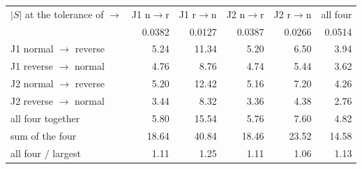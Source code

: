 \begin{tabular}{lrrrrr}
\toprule
$|S|$ at the tolerance of $\to$ & J1 n$\to$r & J1 r$\to$n & J2 n$\to$r & J2 r$\to$n & all four \\
 & 0.0382 & 0.0127 & 0.0387 & 0.0266 & 0.0514 \\
\midrule
J1 normal $\to$ reverse & 5.24 & 11.34 & 5.20 & 6.50 & 3.94 \\
J1 reverse $\to$ normal & 4.76 & 8.76 & 4.74 & 5.44 & 3.62 \\
J2 normal $\to$ reverse & 5.20 & 12.42 & 5.16 & 7.20 & 4.26 \\
J2 reverse $\to$ normal & 3.44 & 8.32 & 3.36 & 4.38 & 2.76 \\
\midrule
all four together & 5.80 & 15.54 & 5.76 & 7.60 & 4.82 \\
sum of the four & 18.64 & 40.84 & 18.46 & 23.52 & 14.58 \\
all four $/$ largest & 1.11 & 1.25 & 1.11 & 1.06 & 1.13 \\
\bottomrule
\end{tabular}
